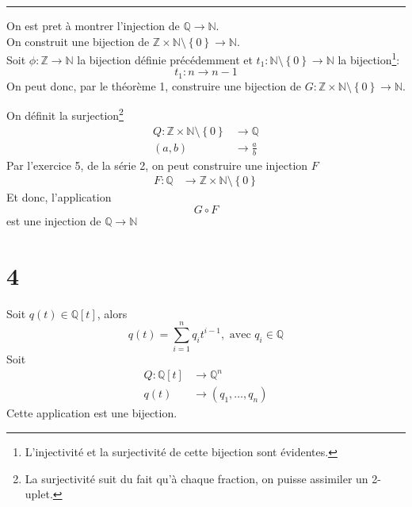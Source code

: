 \documentclass[11pt, a4paper, twoside]{article}
\newcommand\hr{
    \noindent\rule[0.5ex]{\linewidth}{0.5pt}\newline
}
\begin{document}
\hr
On est pret à montrer l'injection de $\mathbb{Q} \to \mathbb{N}$.\\
On construit une bijection de $ \mathbb{Z} \times \mathbb{N} \setminus \left\{ 0 \right\} \to \mathbb{N} $.\\
Soit $\phi: \mathbb{Z} \to \mathbb{N}$ la bijection définie précédemment et $t_1: \mathbb{N} \setminus \left\{ 0 \right\} \to \mathbb{N}$ la bijection\footnote{L'injectivité et la surjectivité de cette bijection sont évidentes.}:
\[ 
t_1: n \to n-1
\]
On peut donc, par le théorème 1, construire une bijection de $G:\mathbb{Z} \times \mathbb{N} \setminus \left\{ 0 \right\} \to \mathbb{N} $.

On définit la surjection\footnote{La surjectivité suit du fait qu'à chaque fraction, on puisse assimiler un 2-uplet.}
 \begin{align*}
	 Q: \mathbb{Z} \times \mathbb{N} \setminus \left\{ 0 \right\} &\to \mathbb{Q}\\
	 ( a,b) & \to \frac{a}{b}
\end{align*}
Par l'exercice 5, de la série 2, on peut construire une injection $F$
\begin{align*}
	F: \mathbb{Q} &\to \mathbb{Z} \times \mathbb{N} \setminus \left\{ 0 \right\} 
\end{align*}
Et donc, l'application
\[ 
	G \circ F
\]
est une injection de $\mathbb{Q} \to \mathbb{N}$
\section*{4}
Soit $q(t) \in \mathbb{Q}[t]$, alors
\[ 
	q(t) = \sum_{i=1}^{n} q_i t^{i-1}, \text{ avec } q_i \in \mathbb{Q}
\]
Soit 
 \begin{align*}
	 Q: \mathbb{Q}[t] &\to \mathbb{Q}^{n}\\
	 q(t) &\to (q_1, \ldots, q_n)
\end{align*}
Cette application est une bijection.
\end{document}
